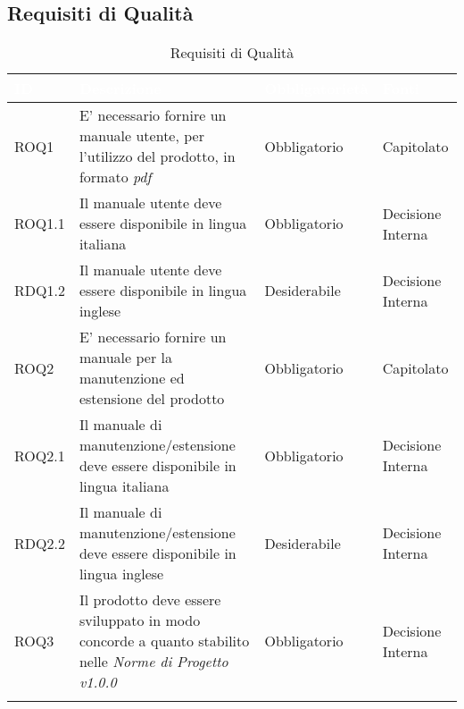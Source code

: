 \subsection{Requisiti di Qualità}\label{RQ}
\begin{center}
\begin{longtable}[c]{|m{}|m{}|m{}|m{}|}
\hline
\rowcolor{bluelogo}\textbf{\textcolor{white}{ID}} & \textbf{\textcolor{white}{Descrizione}} & \textbf{\textcolor{white}{Obbligatorietà}} & \textbf{\textcolor{white}{Fonti}}\\
\hline \hline
\endhead
ROQ1 & E' necessario fornire un manuale utente, per l'utilizzo del prodotto, in formato \textit{pdf} & Obbligatorio & Capitolato\\
\hline
\rowcolor{grigio}ROQ1.1 & Il manuale utente deve essere disponibile in lingua italiana & Obbligatorio & Decisione Interna\\
\hline
RDQ1.2 & Il manuale utente deve essere disponibile in lingua inglese & Desiderabile & Decisione Interna\\
\hline
\rowcolor{grigio}ROQ2 & E' necessario fornire un manuale per la manutenzione ed estensione del prodotto & Obbligatorio & Capitolato\\
\hline
ROQ2.1 & Il manuale di manutenzione/estensione deve essere disponibile in lingua italiana & Obbligatorio & Decisione Interna\\
\hline
\rowcolor{grigio}RDQ2.2 & Il manuale di manutenzione/estensione deve essere disponibile in lingua inglese & Desiderabile & Decisione Interna\\
\hline
ROQ3 & Il prodotto deve essere sviluppato in modo concorde a quanto stabilito nelle \textit{Norme di Progetto v1.0.0} & Obbligatorio & Decisione Interna\\
\hline
\caption{Requisiti di Qualità}
\end{longtable}
\end{center}




